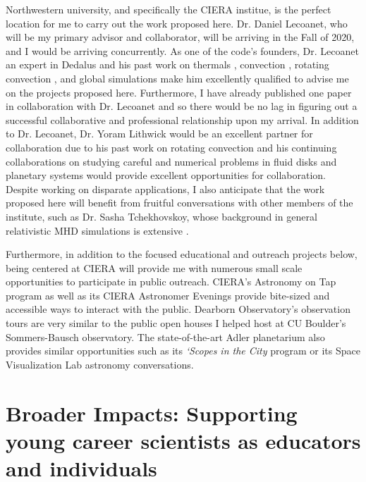 \documentclass[aasms,11pt]{article}
\makeatletter
\renewcommand{\sectionmark}[1]{%
  \markboth{\ifnum \c@secnumdepth>\z@
      \thesection: \hskip 1em\relax
    \fi #1}{}}
\makeatother
\begin{document}
\label{sct:northwestern}
Northwestern university, and specifically the CIERA institue, is the perfect location for me to carry out the work proposed here.
Dr. Daniel Lecoanet, who will be my primary advisor and collaborator, will be arriving in the Fall of 2020, and I would be arriving concurrently.
As one of the code's founders, Dr. Lecoanet an expert in Dedalus and his past work on thermals \citep{lecoanet&jeevanjee2019, tarshis&all2018}, convection \citep{lecoanet&quataert2013, lecoanet&all2014, couston&all2017}, rotating convection \citep{couston&all2019}, and global simulations \citep{lecoanet&all2018} make him excellently qualified to advise me on the projects proposed here.
Furthermore, I have already published one paper in collaboration with Dr. Lecoanet and so there would be no lag in figuring out a successful collaborative and professional relationship upon my arrival.
In addition to Dr. Lecoanet, Dr. Yoram Lithwick would be an excellent partner for collaboration due to his past work on rotating convection \citep{BDLithwick2014} and his continuing collaborations on studying careful and numerical problems in fluid disks \citep{LDLithwick2019} and planetary systems \citep{hadden&lithwick2018} would provide excellent opportunities for collaboration.
Despite working on disparate applications, I also anticipate that the work proposed here will benefit from fruitful conversations with other members of the institute, such as Dr. Sasha Tchekhovskoy, whose background in general relativistic MHD simulations is extensive \citep[as in e.g.,][]{tchekhovskoy&bromberg2016}.

Furthermore, in addition to the focused educational and outreach projects below, being centered at CIERA will provide me with numerous small scale opportunities to participate in public outreach.
CIERA's Astronomy on Tap program as well as its CIERA Astronomer Evenings provide bite-sized and accessible ways to interact with the public.
Dearborn Observatory's observation tours are very similar to the public open houses I helped host at CU Boulder's Sommers-Bausch observatory.
The state-of-the-art Adler planetarium also provides similar opportunities such as its \emph{`Scopes in the City} program or its Space Visualization Lab astronomy conversations.

\section{Broader Impacts: Supporting young career scientists as educators and individuals}
\sectionmark{Broader Impacts}
\vspace{-9pt}
\end{document}
